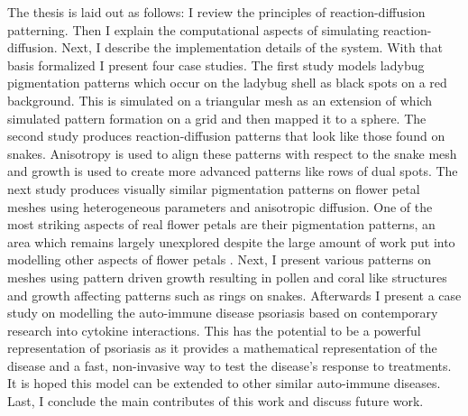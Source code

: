 The thesis is laid out as follows: I review the principles of reaction-diffusion patterning. Then I explain the computational aspects of simulating reaction-diffusion. Next, I describe the implementation details of the \ProgramName{} system. With that basis formalized I present four case studies. The first study models ladybug pigmentation patterns which occur on the ladybug shell as black spots on a red background. This is simulated on a triangular mesh as an extension of \citep{Liaw2001} which simulated pattern formation on a grid and then mapped it to a sphere. The second study produces reaction-diffusion patterns that look like those found on snakes. Anisotropy is used to align these patterns with respect to the snake mesh and growth is used to create more advanced patterns like rows of dual spots. The next study produces visually similar pigmentation patterns on flower petal meshes using heterogeneous parameters and anisotropic diffusion. One of the most striking aspects of real flower petals are their pigmentation patterns, an area which remains largely unexplored despite the large amount of work put into modelling other aspects of flower petals \citep{Owens2016}. Next, I present various patterns on meshes using pattern driven growth resulting in pollen and coral like structures and growth affecting patterns such as rings on snakes. Afterwards I present a case study on modelling the auto-immune disease psoriasis based on contemporary research into cytokine interactions. This has the potential to be a powerful representation of psoriasis as it provides a mathematical representation of the disease and a fast, non-invasive way to test the disease's response to treatments. It is hoped this model can be extended to other similar auto-immune diseases. Last, I conclude the main contributes of this work and discuss future work.